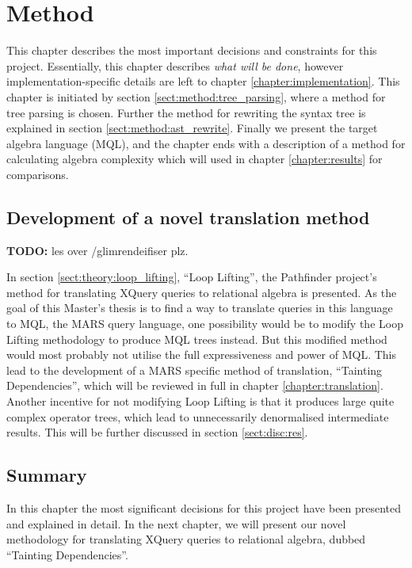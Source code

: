 \chapter{Method}
\label{chapter:method}
This chapter describes the most important decisions and constraints for this
project. Essentially, this chapter describes \emph{what will be done}, however
implementation-specific details are left to chapter
\ref{chapter:implementation}. This chapter is initiated by section
\ref{sect:method:tree_parsing}, where a method for tree parsing is chosen.
Further the method for rewriting the syntax tree is explained in section
\ref{sect:method:ast_rewrite}. Finally we present the target algebra language
(MQL), and the chapter ends with a description of a method for calculating
algebra complexity which will used in chapter \ref{chapter:results} for
comparisons.

\section{Development of a novel translation method}
\textbf{\LARGE TODO:} les over /glimrendeifiser plz.

In section \ref{sect:theory:loop_lifting}, ``Loop Lifting'', the Pathfinder project's method for translating XQuery
queries to relational algebra is presented. As the goal of this Master's thesis is to find a way to translate
queries in this language to MQL, the MARS query language, one possibility would be to modify the Loop Lifting
methodology to produce MQL trees instead. But this modified method would most probably not utilise the full
expressiveness and power of MQL. This lead to the development of a MARS specific method of translation, ``Tainting
Dependencies'', which will be reviewed in full in chapter \ref{chapter:translation}. Another incentive for not
modifying Loop Lifting is that it produces large quite complex operator trees, which lead to unnecessarily
denormalised intermediate results. This will be further discussed in section \ref{sect:disc:res}.








\section{Summary}
\label{sect:method:summary}
In this chapter the most significant decisions for this project have been
presented and explained in detail. In the next chapter, we will present our
novel methodology for translating XQuery queries to relational algebra, dubbed
``Tainting Dependencies''.
